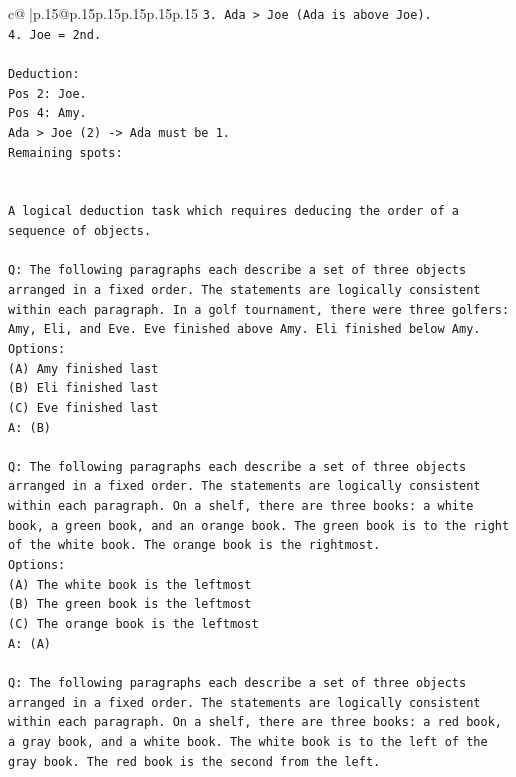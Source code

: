 \documentclass{article}
\begin{document}
{\begin{supertabular}{c@{$\;$}|p{.15\linewidth}@{}p{.15\linewidth}p{.15\linewidth}p{.15\linewidth}p{.15\linewidth}p{.15\linewidth}}
{{{\texttt{3. Ada > Joe (Ada is above Joe).} \\
\texttt{4. Joe = 2nd.} \\
\\ 
\texttt{Deduction:} \\
\texttt{Pos 2: Joe.} \\
\texttt{Pos 4: Amy.} \\
\texttt{Ada > Joe (2) {-}> Ada must be 1.} \\
\texttt{Remaining spots:} \\
\\ 
\\ 
\texttt{A logical deduction task which requires deducing the order of a sequence of objects.} \\
\\ 
\texttt{Q: The following paragraphs each describe a set of three objects arranged in a fixed order. The statements are logically consistent within each paragraph. In a golf tournament, there were three golfers: Amy, Eli, and Eve. Eve finished above Amy. Eli finished below Amy.} \\
\texttt{Options:} \\
\texttt{(A) Amy finished last} \\
\texttt{(B) Eli finished last} \\
\texttt{(C) Eve finished last} \\
\texttt{A: (B)} \\
\\ 
\texttt{Q: The following paragraphs each describe a set of three objects arranged in a fixed order. The statements are logically consistent within each paragraph. On a shelf, there are three books: a white book, a green book, and an orange book. The green book is to the right of the white book. The orange book is the rightmost.} \\
\texttt{Options:} \\
\texttt{(A) The white book is the leftmost} \\
\texttt{(B) The green book is the leftmost} \\
\texttt{(C) The orange book is the leftmost} \\
\texttt{A: (A)} \\
\\ 
\texttt{Q: The following paragraphs each describe a set of three objects arranged in a fixed order. The statements are logically consistent within each paragraph. On a shelf, there are three books: a red book, a gray book, and a white book. The white book is to the left of the gray book. The red book is the second from the left.} \\
}}}
\end{supertabular}}
\end{document}
